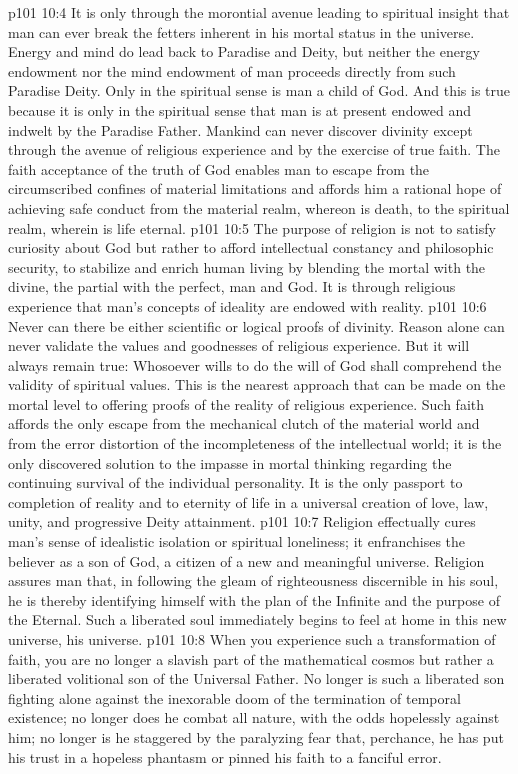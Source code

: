 \vs p101 10:4 It is only through the morontial avenue leading to spiritual insight that man can ever break the fetters inherent in his mortal status in the universe. Energy and mind do lead back to Paradise and Deity, but neither the energy endowment nor the mind endowment of man proceeds directly from such Paradise Deity. Only in the spiritual sense is man a child of God. And this is true because it is only in the spiritual sense that man is at present endowed and indwelt by the Paradise Father. Mankind can never discover divinity except through the avenue of religious experience and by the exercise of true faith. The faith acceptance of the truth of God enables man to escape from the circumscribed confines of material limitations and affords him a rational hope of achieving safe conduct from the material realm, whereon is death, to the spiritual realm, wherein is life eternal.
\vs p101 10:5 \pc The purpose of religion is not to satisfy curiosity about God but rather to afford intellectual constancy and philosophic security, to stabilize and enrich human living by blending the mortal with the divine, the partial with the perfect, man and God. It is through religious experience that man’s concepts of ideality are endowed with reality.
\vs p101 10:6 \pc Never can there be either scientific or logical proofs of divinity. Reason alone can never validate the values and goodnesses of religious experience. But it will always remain true: Whosoever wills to do the will of God shall comprehend the validity of spiritual values. This is the nearest approach that can be made on the mortal level to offering proofs of the reality of religious experience. Such faith affords the only escape from the mechanical clutch of the material world and from the error distortion of the incompleteness of the intellectual world; it is the only discovered solution to the impasse in mortal thinking regarding the continuing survival of the individual personality. It is the only passport to completion of reality and to eternity of life in a universal creation of love, law, unity, and progressive Deity attainment.
\vs p101 10:7 Religion effectually cures man’s sense of idealistic isolation or spiritual loneliness; it enfranchises the believer as a son of God, a citizen of a new and meaningful universe. Religion assures man that, in following the gleam of righteousness discernible in his soul, he is thereby identifying himself with the plan of the Infinite and the purpose of the Eternal. Such a liberated soul immediately begins to feel at home in this new universe, his universe.
\vs p101 10:8 When you experience such a transformation of faith, you are no longer a slavish part of the mathematical cosmos but rather a liberated volitional son of the Universal Father. No longer is such a liberated son fighting alone against the inexorable doom of the termination of temporal existence; no longer does he combat all nature, with the odds hopelessly against him; no longer is he staggered by the paralyzing fear that, perchance, he has put his trust in a hopeless phantasm or pinned his faith to a fanciful error.
